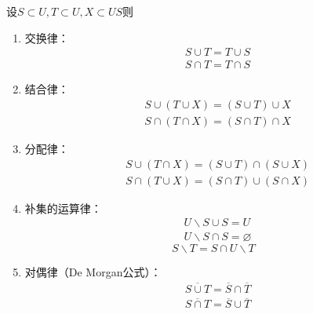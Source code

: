 \begin{formal}
\begin{proposition}[集合的运算律]\label{prop:集合的运算律}
    设$S\subset U,T\subset U,X\subset US$则\begin{enumerate}[label={\textup{(\arabic*)}}]
        \item 交换律：\begin{align*}
            &S\cup T=T\cup S\\
            &S\cap T=T\cap S
        \end{align*}
        \item 结合律：\begin{align*}
            &S\cup \left( T\cup X \right)=\left( S\cup T \right)\cup X\\
            &S\cap \left( T\cap X \right)=\left( S\cap T \right)\cap X
        \end{align*}
        \item 分配律：\begin{align*}
            &S\cup \left( T\cap X \right)=\left( S\cup T \right)\cap \left( S\cup X \right)\\
            &S\cap \left( T\cup X \right)=\left( S\cap T \right)\cup \left( S\cap X \right)
        \end{align*}
        \item 补集的运算律：\begin{align*}
            &U\backslash S\cup S =U\\
            &U\backslash S\cap S=\varnothing
        \end{align*}\[
        S\backslash T =S\cap U\backslash T
        \]
        \item 对偶律（\textup{De Morgan}公式）：\begin{align*}
            &\overline{S\cup T}=\overline{S}\cap \overline{T}\\
            &\overline{S\cap T}=\overline{S}\cup \overline{T}
        \end{align*}
    \end{enumerate}
\end{proposition}
\begin{Proof}
\end{Proof}
\end{formal}
